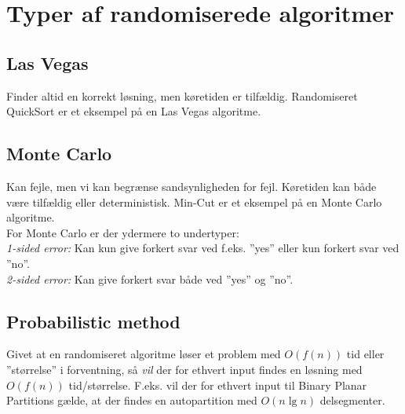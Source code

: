 \section{Typer af randomiserede algoritmer}
\subsection{Las Vegas}
Finder altid en korrekt løsning, men køretiden er tilfældig. Randomiseret QuickSort er et eksempel på en Las Vegas algoritme.

\subsection{Monte Carlo}
Kan fejle, men vi kan begrænse sandsynligheden for fejl. Køretiden kan både være tilfældig eller deterministisk. Min-Cut er et eksempel på en Monte Carlo algoritme.\\

For Monte Carlo er der ydermere to undertyper:\\
\emph{1-sided error:} Kan kun give forkert svar ved f.eks. ''yes'' eller kun forkert svar ved ''no''.\\
\emph{2-sided error:} Kan give forkert svar både ved ''yes'' og ''no''.



\subsection{Probabilistic method}
Givet at en randomiseret algoritme løser et problem med $O(f(n))$ tid eller ''størrelse'' i forventning, så \emph{vil} der for ethvert input findes en løsning med $O(f(n))$ tid/størrelse. F.eks. vil der for ethvert input til Binary Planar Partitions gælde, at der findes en autopartition med $O(n \lg n)$ delsegmenter.
